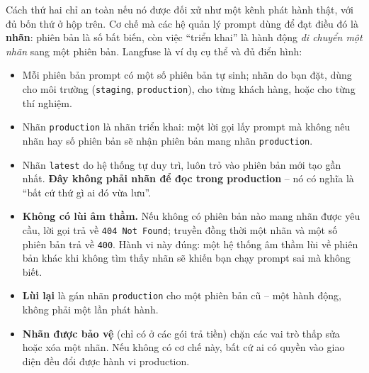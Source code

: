\noindent Cách thứ hai chỉ an toàn nếu nó được đối xử như một kênh phát hành thật, với đủ bốn thứ ở hộp trên. Cơ chế mà các hệ quản lý prompt dùng để đạt điều đó là \textbf{nhãn}: phiên bản là số bất biến, còn việc ``triển khai'' là hành động \emph{di chuyển một nhãn} sang một phiên bản. Langfuse là ví dụ cụ thể và đủ điển hình:

\begin{itemize}
	\item Mỗi phiên bản prompt có một số phiên bản tự sinh; nhãn do bạn đặt, dùng cho môi trường (\texttt{staging}, \texttt{production}), cho từng khách hàng, hoặc cho từng thí nghiệm.
	\item Nhãn \texttt{production} là nhãn triển khai: một lời gọi lấy prompt mà không nêu nhãn hay số phiên bản sẽ nhận phiên bản mang nhãn \texttt{production}.
	\item Nhãn \texttt{latest} do hệ thống tự duy trì, luôn trỏ vào phiên bản mới tạo gần nhất. \textbf{Đây không phải nhãn để đọc trong production} -- nó có nghĩa là ``bất cứ thứ gì ai đó vừa lưu''.
	\item \textbf{Không có lùi âm thầm.} Nếu không có phiên bản nào mang nhãn được yêu cầu, lời gọi trả về \texttt{404 Not Found}; truyền đồng thời một nhãn và một số phiên bản trả về \texttt{400}. Hành vi này đúng: một hệ thống âm thầm lùi về phiên bản khác khi không tìm thấy nhãn sẽ khiến bạn chạy prompt sai mà không biết.
	\item \textbf{Lùi lại} là gán nhãn \texttt{production} cho một phiên bản cũ -- một hành động, không phải một lần phát hành.
	\item \textbf{Nhãn được bảo vệ} (chỉ có ở các gói trả tiền) chặn các vai trò thấp sửa hoặc xóa một nhãn. Nếu không có cơ chế này, bất cứ ai có quyền vào giao diện đều đổi được hành vi production.
\end{itemize}

